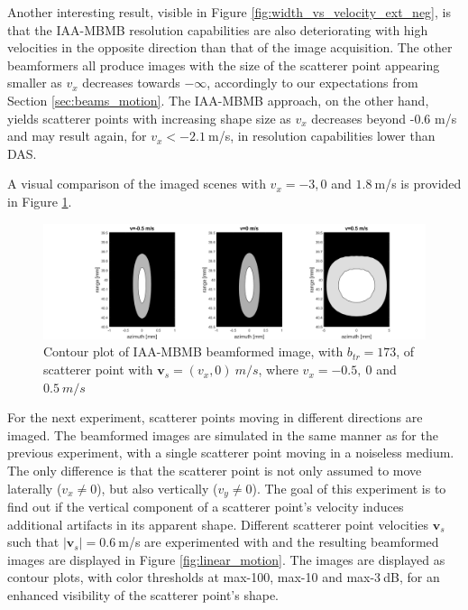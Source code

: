 Another interesting result, visible in Figure \ref{fig:width_vs_velocity_ext_neg}, is that the IAA-MBMB resolution capabilities are also deteriorating with high velocities in the opposite direction than that of the image acquisition.
The other beamformers all produce images with the size of the scatterer point appearing smaller as $v_x$ decreases towards $-\infty$, accordingly to our expectations from Section \ref{sec:beams_motion}. The IAA-MBMB approach, on the other hand, yields scatterer points with increasing shape size as $v_x$ decreases beyond -0.6 m/s and may result again, for $v_x < -2.1~$m/s, in resolution capabilities lower than DAS.


A visual comparison of the imaged scenes with $v_x = -3, 0$ and $1.8~$m/s is provided in Figure \ref{fig:iaa_mbmb_173}.

\begin{figure}[ht]
    \centering
    \includegraphics[width=\linewidth]{./images/results/2.1/IAA_MBMB_illustration.png}
    \caption{Contour plot of IAA-MBMB beamformed image, with $b_{tr}=173$, of scatterer point with $\boldsymbol{v}_s = (v_x, 0)~m/s$, where $v_x = -0.5,~0$ and $0.5~m/s$}
    \label{fig:iaa_mbmb_173}
\end{figure}
\fi

For the next experiment, scatterer points moving in different directions are imaged. The beamformed images are simulated in the same manner as for the previous experiment, with a single scatterer point moving in a noiseless medium. The only difference is that the scatterer point is not only assumed to move laterally ($v_x \neq 0$), but also vertically ($v_y \neq 0$). The goal of this experiment is to find out if the vertical component of a scatterer point's velocity induces additional artifacts in its apparent shape. Different scatterer point velocities $\boldsymbol{v}_s$  such that $|\boldsymbol{v}_s| = 0.6~$m/s are experimented with and the resulting beamformed images are displayed in Figure \ref{fig:linear_motion}. The images are displayed as contour plots, with color thresholds at max-100, max-10 and max-3$~$dB, for an enhanced visibility of the scatterer point's shape.

